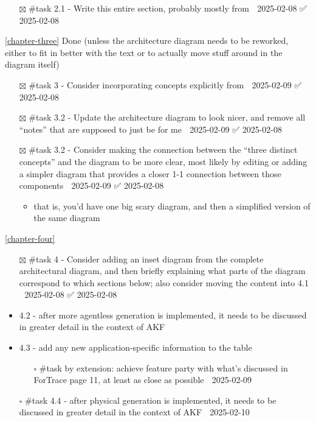 \begin{itemize}
\tightlist
\item[$\boxtimes$]
  \#task 2.1 - Write this entire section, probably mostly from
  \cite{grajedaAvailabilityDatasetsDigital2017} 📅 2025-02-08 ✅
  2025-02-08
\end{itemize}

\autoref{chapter-three} Done (unless the architecture
diagram needs to be reworked, either to fit in better with the text or
to actually move stuff around in the diagram itself)

\begin{itemize}
\tightlist
\item[$\boxtimes$]
  \#task 3 - Consider incorporating concepts explicitly from
  \cite{horsmanDatasetConstructionChallenges2021} 📅 2025-02-09 ✅
  2025-02-08
\item[$\boxtimes$]
  \#task 3.2 - Update the architecture diagram to look nicer, and remove
  all ``notes'' that are supposed to just be for me 📅 2025-02-09 ✅
  2025-02-08
\item[$\boxtimes$]
  \#task 3.2 - Consider making the connection between the ``three
  distinct concepts'' and the diagram to be more clear, most likely by
  editing or adding a simpler diagram that provides a closer 1-1
  connection between those components 📅 2025-02-09 ✅ 2025-02-08

  \begin{itemize}
  \tightlist
  \item
    that is, you'd have one big scary diagram, and then a simplified
    version of the same diagram
  \end{itemize}
\end{itemize}

\autoref{chapter-four}

\begin{itemize}
\tightlist
\item[$\boxtimes$]
  \#task 4 - Consider adding an inset diagram from the complete
  architectural diagram, and then briefly explaining what parts of the
  diagram correspond to which sections below; also consider moving the
  content into 4.1 📅 2025-02-08 ✅ 2025-02-08
\item
  4.2 - after more agentless generation is implemented, it needs to be
  discussed in greater detail in the context of AKF
\item
  4.3 - add any new application-specific information to the table

  \begin{itemize}
  \tightlist
  \item[$\square$]
    \#task by extension: achieve feature party with what's discussed in
    ForTrace page 11, at least as close as possible 📅 2025-02-09
  \end{itemize}
\item[$\square$]
  \#task 4.4 - after physical generation is implemented, it needs to be
  discussed in greater detail in the context of AKF 📅 2025-02-10
\end{itemize}

